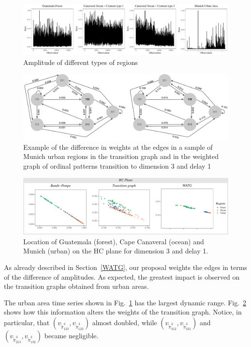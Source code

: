 \documentclass[journal]{IEEEtran}
\begin{document}
\begin{figure}[hbt]
	\includegraphics[width=2\columnwidth]{Figures/SAR_TS.pdf}
	\caption{Amplitude of different types of regions}
	\label{fig:timeSeries}
\end{figure}

\begin{figure}[hbt]
	\includegraphics[width=2\columnwidth]{Figures/graphs.pdf}
	\caption{Example of the difference in weights at the edges in a sample of Munich urban regions in the transition graph and in the weighted graph of ordinal patterns
		transition to dimension 3 and delay 1}
	\label{fig:graphs}
\end{figure}

\begin{figure}[hbt]
	\includegraphics[width=2\columnwidth]{Figures/HCAnalysis.pdf}
	\caption{Location of Guatemala (forest), Cape Canaveral (ocean) and Munich (urban) on the HC plane for dimension 3 and delay 1.}
	\label{fig:plotsHC}
\end{figure}

As already described in Section~\ref{WATG}, our proposal weights the edges in terms of the difference of amplitudes.
As expected, the greatest impact is observed on the transition graphs obtained from urban areas.

The urban area time series shown in Fig.~\ref{fig:timeSeries} has the largest dynamic range.
Fig.~\ref{fig:graphs} shows how this information alters the weights of the transition graph.
Notice, in particular, that 
$(v_{\widetilde \pi^3_{123}}, v_{\widetilde \pi^3_{123}})$ almost doubled, while 
$(v_{\widetilde \pi^3_{312}}, v_{\widetilde \pi^3_{231}})$ and $(v_{\widetilde \pi^3_{213}}, v_{\widetilde \pi^3_{132}})$ became negligible.
\end{document}
